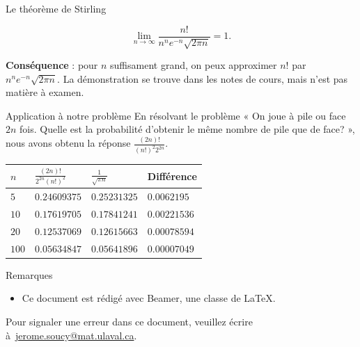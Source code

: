 \documentclass[nuit,charter,pied]{BeamerJS}
\begin{document}
\begin{frame}{Le théorème de Stirling}
	 \begin{thm}{}
	 	\[\lim_{n\rightarrow \infty}\frac{n!}{n^n e^{-n}\sqrt{2\pi n}}=1.\]
	 \end{thm}
	 \pause
\textbf{Conséquence} : pour $n$ suffisament grand, on peux approximer $n!$ par $n^n e^{-n}\sqrt{2\pi n}$.
\vfill 
\pause
La démonstration se trouve dans les notes de cours, mais n'est pas matière à examen.
\end{frame}
\begin{frame}{Application à notre problème}
	En résolvant le problème « On joue à pile ou face $2n$ fois. Quelle est la probabilité d'obtenir le même nombre de pile que de face? », nous avons obtenu la réponse \(\frac{(2n)!}{(n!)^2 2^{2n}}\).
	\pause
	\begin{center}
	\begin{tabular}{@{}llll@{}}
\toprule
\(n\) & \(\frac{(2n)!}{2^{2n}(n!)^2}\) & \(\frac{1}{\sqrt{\pi n}}\) & Différence           \\ \midrule
$5$     & \(\num{0.24609375}\)     & \(\num{0.25231325}\)       & \(\num{0.0062195}\)  \\
$10$    & \(\num{0.17619705}\)     & \(\num{0.17841241}\)       & \(\num{0.00221536}\) \\
$20$    & \(\num{0.12537069}\)     & \(\num{0.12615663}\)       & \(\num{0.00078594}\) \\
$100$   & \(\num{0.05634847}\)     & \(\num{0.05641896}\)       & \(\num{0.00007049}\) \\ \bottomrule
\end{tabular}
\end{center}
\end{frame}

\begin{frame}{Remarques}

 \begin{rems}
 	\begin{itemize}
 		\item Ce document est rédigé avec Beamer, une classe de \LaTeX.
 	\end{itemize}
 \end{rems}
 	
 	\vfill
 	\footnotesize Pour signaler une erreur dans ce document, veuillez écrire à~\href{mailto:jerome.soucy@mat.ulaval.ca}{jerome.soucy@mat.ulaval.ca}.
 \end{frame}
\end{document}
